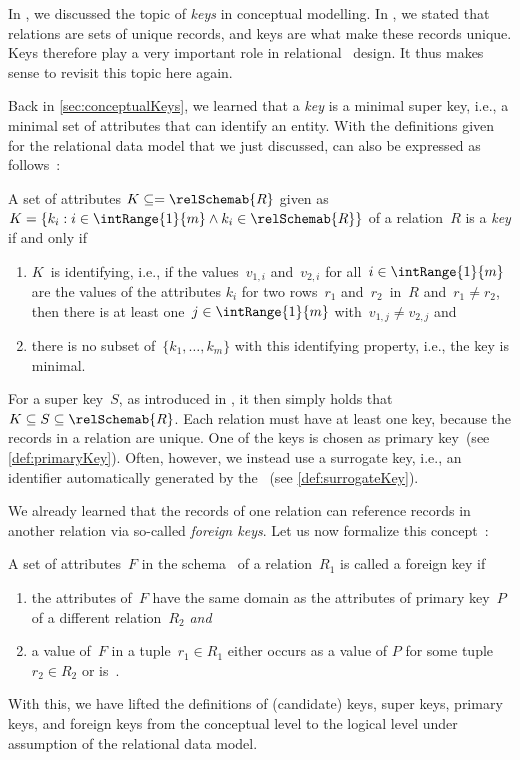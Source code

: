 %
%
In , we discussed the topic of \emph{keys} in conceptual modelling.
In , we stated that relations are sets of unique records, and keys are what make these records unique.
Keys therefore play a very important role in relational \db\ design.
It thus makes sense to revisit this topic here again.

Back in \cref{sec:conceptualKeys}, we learned that a \emph{key} is a minimal super key, i.e., a minimal set of attributes that can identify an entity.
With the definitions given for the relational data model that we just discussed,  can also be expressed as follows~\cite{SS2005EIDDDFDB:SDLDUTRDM}:%
%
\begin{definition}[Key]%
\label{def:key2}%
A set of attributes $K\subseteq=\relSchemab{R}$ given as~$K=\{k_i:i\in\intRange{1}{m} \land k_i\in\relSchemab{R}\}$ of a relation~$R$ is a \emph{key} if and only if%
%
\begin{enumerate}%
%
\item $K$~is identifying, i.e., if the values~$v_{1,i}$ and~$v_{2,i}$ for all~$i\in\intRange{1}{m}$ are the values of the attributes $k_i$ for two rows~$r_1$ and~$r_2$~in~$R$ and~$r_1\neq r_2$, then there is at least one~$j\in\intRange{1}{m}$ with~$v_{1,j}\neq v_{2,j}$ and%
%
\item there is no subset of~$\{k_1, \dots, k_m\}$ with this identifying property, i.e., the key is minimal.%
%
\end{enumerate}%
\end{definition}%
%
For a super key~$S$, as introduced in , it then simply holds that~$K\subseteq S\subseteq\relSchemab{R}$.
Each relation must have at least one key, because the records in a relation are unique.
One of the keys is chosen as primary key~(see \cref{def:primaryKey}).
Often, however, we instead use a surrogate key, i.e., an identifier automatically generated by the \dbms~(see \cref{def:surrogateKey}).

We already learned that the records of one relation can reference records in another relation via so-called \emph{foreign keys}.
Let us now formalize this concept~\cite{SS2005EIDDDFDB:SDLDUTRDM}:%
%
\begin{definition}%
\label{def:foreignKey}%
A set of attributes~$F$ in the schema~ of a relation~$R_1$ is called a foreign key if%
\begin{enumerate}%
\item the attributes of~$F$ have the same domain as the attributes of primary key~$P$ of a different relation~$R_2$ \emph{and}%
\item a value of~$F$ in a tuple~$r_1\in R_1$ either occurs as a value of $P$ for some tuple~$r_2\in R_2$ or is~.%
\end{enumerate}%
\end{definition}%
%
With this, we have lifted the definitions of (candidate) keys, super keys, primary keys, and foreign keys from the conceptual level to the logical level under assumption of the relational data model.%
%
\endhsection%
